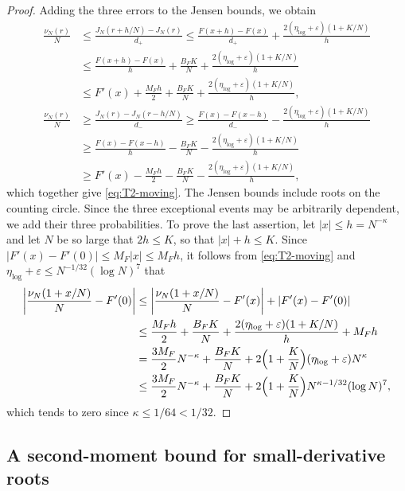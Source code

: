 \begin{proof}
Adding the three errors to the Jensen bounds, we obtain
\begin{align*}
 \frac{\nu_N(r)}N
 &\leq\frac{J_N(r+h/N)-J_N(r)}{d_+}
 \leq\frac{F(x+h)-F(x)}{d_+}+\frac{2(\eta_{\log}+\varepsilon)(1+K/N)}h\\
 &\leq\frac{F(x+h)-F(x)}h+\frac{B_FK}N
      +\frac{2(\eta_{\log}+\varepsilon)(1+K/N)}h\\
 &\leq F'(x)+\frac{M_Fh}2+\frac{B_FK}N
      +\frac{2(\eta_{\log}+\varepsilon)(1+K/N)}h,\\
 \frac{\nu_N(r)}N
 &\geq\frac{J_N(r)-J_N(r-h/N)}{d_-}
 \geq\frac{F(x)-F(x-h)}{d_-}-\frac{2(\eta_{\log}+\varepsilon)(1+K/N)}h\\
 &\geq\frac{F(x)-F(x-h)}h-\frac{B_FK}N
      -\frac{2(\eta_{\log}+\varepsilon)(1+K/N)}h\\
 &\geq F'(x)-\frac{M_Fh}2-\frac{B_FK}N
      -\frac{2(\eta_{\log}+\varepsilon)(1+K/N)}h,
\end{align*}
which together give \eqref{eq:T2-moving}.
The Jensen bounds include roots on the counting circle.
Since the three exceptional events may be arbitrarily dependent, we add
their three probabilities.
To prove the last assertion, let $|x|\leq h=N^{-\kappa}$ and let $N$ be so
large that $2h\leq K$, so that $|x|+h\leq K$. Since
$|F'(x)-F'(0)|\leq M_F|x|\leq M_Fh$, it follows from
\eqref{eq:T2-moving} and $\eta_{\log}+\varepsilon\leq N^{-1/32}(\log N)^7$
that
\begin{align*}
 \left|\frac{\nu_N(1+x/N)}N-F'(0)\right|
 &\leq\left|\frac{\nu_N(1+x/N)}N-F'(x)\right|+|F'(x)-F'(0)|\\
 &\leq\frac{M_Fh}{2}+\frac{B_FK}{N}
       +\frac{2(\eta_{\log}+\varepsilon)(1+K/N)}h+M_Fh\\
 &=\frac{3M_F}{2}N^{-\kappa}+\frac{B_FK}{N}
       +2\Bigl(1+\frac KN\Bigr)(\eta_{\log}+\varepsilon)N^{\kappa}\\
 &\leq\frac{3M_F}{2}N^{-\kappa}+\frac{B_FK}{N}
       +2\Bigl(1+\frac KN\Bigr)N^{\kappa-1/32}(\log N)^7,
\end{align*}
which tends to zero since $\kappa\leq1/64<1/32$.
\end{proof}

\subsection{A second-moment bound for small-derivative roots}

